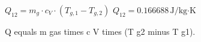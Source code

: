 \( Q_{12} = m_g \cdot c_V \cdot (T_{g,1} - T_{g,2}) \)  
\( Q_{12} = 0.166688 \, \text{J/kg·K} \)

Q equals m gas times c V times (T g2 minus T g1).